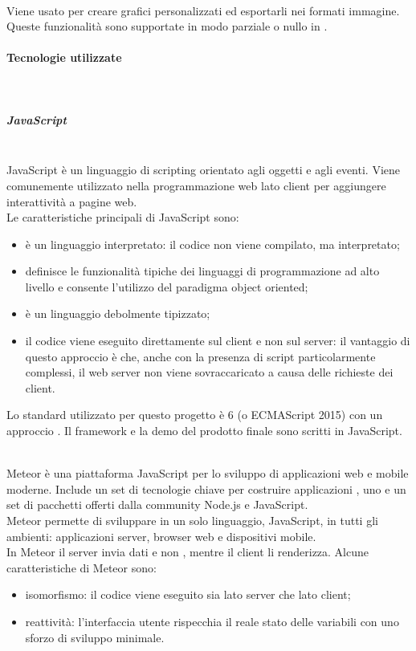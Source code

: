  \mbox{}\\
Viene usato per creare grafici personalizzati ed esportarli nei formati immagine. Queste funzionalità sono supportate in modo parziale o nullo in .

\paragraph{Tecnologie utilizzate}\mbox{}\\
\subparagraph{JavaScript}\mbox{}\\
JavaScript è un linguaggio di scripting orientato agli oggetti e agli eventi. Viene comunemente utilizzato nella programmazione web lato client per aggiungere interattività a pagine web.\\
Le caratteristiche principali di JavaScript sono:
\begin{itemize}
	\item è un linguaggio interpretato: il codice non viene compilato, ma interpretato;
	\item definisce le funzionalità tipiche dei linguaggi di programmazione ad alto livello e consente l'utilizzo del paradigma object oriented;
	\item è un linguaggio debolmente tipizzato;
	\item il codice viene eseguito direttamente sul client e non sul server: il vantaggio di questo approccio è che, anche con la presenza di script particolarmente complessi, il web server non viene sovraccaricato a causa delle richieste dei client.
\end{itemize}
Lo standard utilizzato per questo progetto è  6 (o {ECMAScript} 2015) con un approccio .
Il framework e la demo del prodotto finale sono scritti in JavaScript.

\mbox{}\\
Meteor è una piattaforma JavaScript  per lo sviluppo di applicazioni web e mobile moderne. Include un set di tecnologie chiave per costruire applicazioni , uno  e un set di pacchetti offerti dalla community Node.js e JavaScript.\\
Meteor permette di sviluppare in un solo linguaggio, JavaScript, in tutti gli ambienti: applicazioni server, browser web e dispositivi mobile.\\
In Meteor il server invia dati e non , mentre il client li renderizza.
Alcune caratteristiche di Meteor sono:
\begin{itemize}
	\item isomorfismo: il codice viene eseguito sia lato server che lato client;
	\item reattività: l'interfaccia utente rispecchia il reale stato delle variabili con uno sforzo di sviluppo minimale.
\end{itemize}

